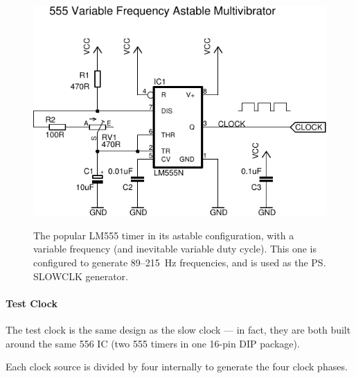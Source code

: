 \begin{figure}
\centering
\includegraphics{figs/fig-555-astable.pdf}\\
\caption[LM555 in astable configuration] {\label{fig:555-astable}The popular LM555 timer in its astable
  configuration, with a variable frequency (and inevitable variable duty
  cycle). This one is configured to generate 89–215~Hz frequencies, and is used
  as the \ps{SLOWCLK} generator.}
\end{figure}

\paragraph{Test Clock}

The test clock is the same design as the slow clock — in fact, they are both
built around the same 556 IC (two 555 timers in one 16-pin \gls{DIP} package).


 Each clock source is
divided by four internally to generate the four clock phases.

 




